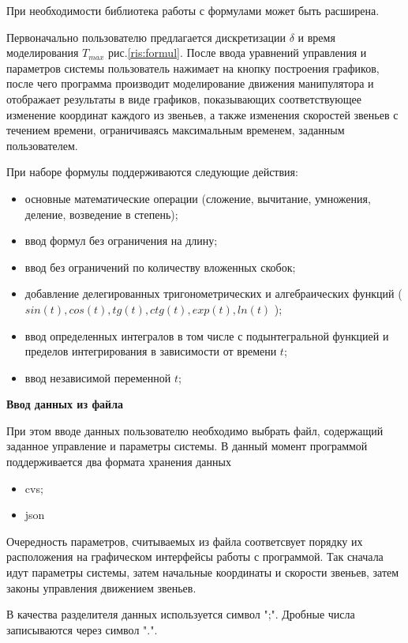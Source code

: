 При необходимости библиотека работы с формулами может быть расширена.

Первоначально пользователю предлагается дискретизации $\delta$  и время моделирования  $T_{max}$ рис.\eqref{ris:formul}. После ввода уравнений управления и параметров системы пользователь нажимает на кнопку построения графиков, после чего программа производит моделирование движения манипулятора и отображает результаты в виде графиков, показывающих соответствующее изменение координат каждого из звеньев, а также изменения скоростей звеньев с течением времени, ограничиваясь максимальным временем, заданным пользователем.

При наборе формулы поддерживаются следующие действия:
\begin{itemize}
\item{основные математические операции (сложение, вычитание, умножения, деление, возведение в степень);}
\item{ввод формул без ограничения на длину;}
\item{ввод без ограничений по количеству вложенных скобок;}
\item{добавление делегированных тригонометрических и алгебраических функций ($sin(t), cos(t), tg(t), ctg(t), exp(t), ln(t)$ );}
\item{ввод определенных интегралов в том числе с подынтегральной функцией и пределов интегрирования в зависимости от времени $t$;}
\item{ввод независимой переменной $t$;}
\end{itemize}

\textbf{Ввод данных из файла}

При этом вводе данных пользователю необходимо выбрать файл, содержащий заданное управление и параметры системы. В данный момент программой поддерживается два формата хранения данных

\begin{itemize}
\item{cvs;}
\item{json}
\end{itemize}

Очередность параметров, считываемых из файла соответсвует порядку их расположения на графическом интерфейсы работы с программой. Так сначала идут параметры системы, затем начальные координаты и скорости звеньев, затем законы управления движением звеньев.

В качества разделителя данных используется символ ";". Дробные числа записываются через символ ".".


